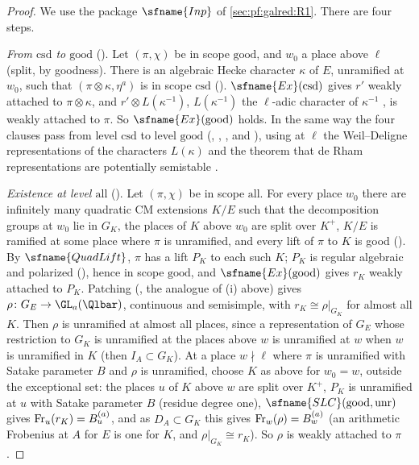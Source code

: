 \begin{proof}
We use the package $\sfname{Inp}$ of \cref{sec:pf:galred:R1}. There are four steps.

\emph{From $\mathrm{csd}$ to $\mathrm{good}$} (). Let $(\pi,\chi)$ be in scope
$\mathrm{good}$, and $w_0$ a place above $\ell$ (split, by goodness). There is an algebraic Hecke character $\kappa$ of $E$,
unramified at $w_0$, such that $(\pi\otimes\kappa,\eta^a)$ is in scope $\mathrm{csd}$
(). $\sfname{Ex}(\mathrm{csd})$ gives $r'$ weakly
attached to $\pi\otimes\kappa$, and $r'\otimes L(\kappa^{-1})$, $L(\kappa^{-1})$ the $\ell$-adic character of $\kappa^{-1}$
\cite{Serre1968}, is weakly attached to $\pi$. So $\sfname{Ex}(\mathrm{good})$ holds. In the same way the four clauses pass from
level $\mathrm{csd}$ to level $\mathrm{good}$ (, , , and ),
using at $\ell$ the Weil--Deligne representations of the characters $L(\kappa)$ and the theorem that de Rham representations are
potentially semistable \cite{Berger2002}.

\emph{Existence at level $\mathrm{all}$} (). Let $(\pi,\chi)$ be in scope
$\mathrm{all}$. For every place $w_0$ there are infinitely many quadratic CM extensions $K/E$ such that the decomposition groups at
$w_0$ lie in $G_K$, the places of $K$ above $w_0$ are split over $K^+$, $K/E$ is ramified at some place where $\pi$ is unramified,
and every lift of $\pi$ to $K$ is good (). By $\sfname{QuadLift}$, $\pi$ has
a lift $P_K$ to each such $K$; $P_K$ is regular algebraic and polarized (), hence in scope
$\mathrm{good}$, and $\sfname{Ex}(\mathrm{good})$ gives $r_K$ weakly attached to $P_K$. Patching
(, the analogue of (i) above) gives $\rho\colon G_E\to\GL_a(\Qlbar)$, continuous and
semisimple, with $r_K\cong\rho|_{G_K}$ for almost all $K$. Then $\rho$ is unramified at almost all places, since a representation
of $G_E$ whose restriction to $G_K$ is unramified at the places above $w$ is unramified at $w$ when $w$ is unramified in $K$ (then $I_A\subset G_K$). At a place $w\nmid\ell$ where $\pi$ is unramified with Satake parameter
$B$ and $\rho$ is unramified, choose $K$ as above for $w_0=w$, outside the exceptional set: the places $u$ of $K$ above $w$ are split
over $K^+$, $P_K$ is unramified at $u$ with Satake parameter $B$ (residue degree one), $\sfname{SLC}(\mathrm{good},\mathrm{unr})$
gives $\operatorname{Fr}_u(r_K)=B^{(a)}_u$, and as $D_A\subset G_K$ this gives $\operatorname{Fr}_w(\rho)=B^{(a)}_w$
(an arithmetic Frobenius at $A$ for $E$ is one for $K$, and $\rho|_{G_K}\cong r_K$). So $\rho$ is weakly attached to $\pi$.


\end{proof}
